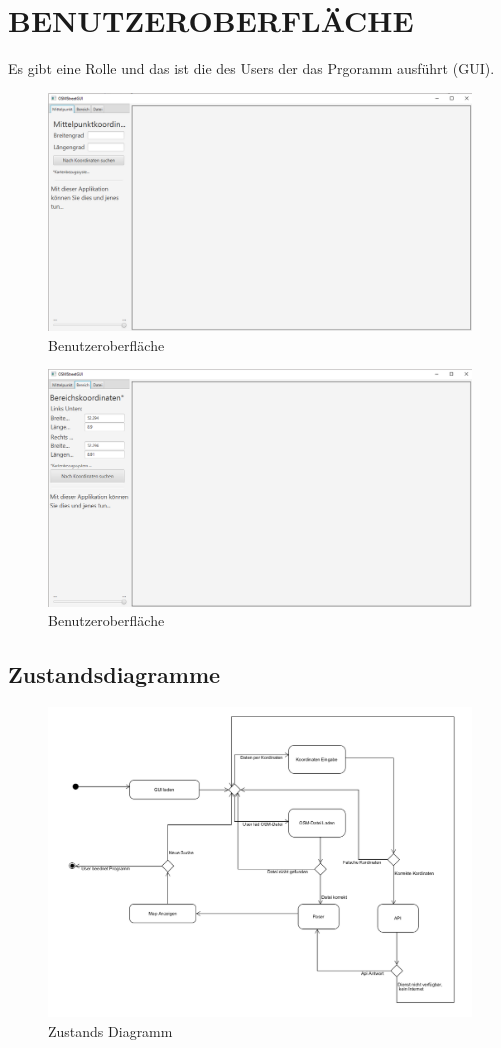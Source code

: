 	\section{\Large BENUTZEROBERFLÄCHE}
	Es gibt eine Rolle und das ist die des Users der das Prgoramm ausführt (GUI).
	\begin{figure}[H]
	\centering
	\includegraphics[width=0.7\linewidth]{images/OSMStreetView}
	\caption{Benutzeroberfläche}
	\label{fig:GUI}
	\end{figure}
	
	\begin{figure}[H]
	\centering
	\includegraphics[width=0.7\linewidth]{images/OSMStreetView2}
	\caption{Benutzeroberfläche}
	\label{fig:GUI2}
	\end{figure}
	
	\subsection{Zustandsdiagramme}
	\begin{figure}[H]
	\centering
	\includegraphics[width=0.7\linewidth]{images/Zustandsdiagramm}
	\caption{Zustands Diagramm}
	\label{fig:Zustands Diagramm}
	\end{figure}
	
